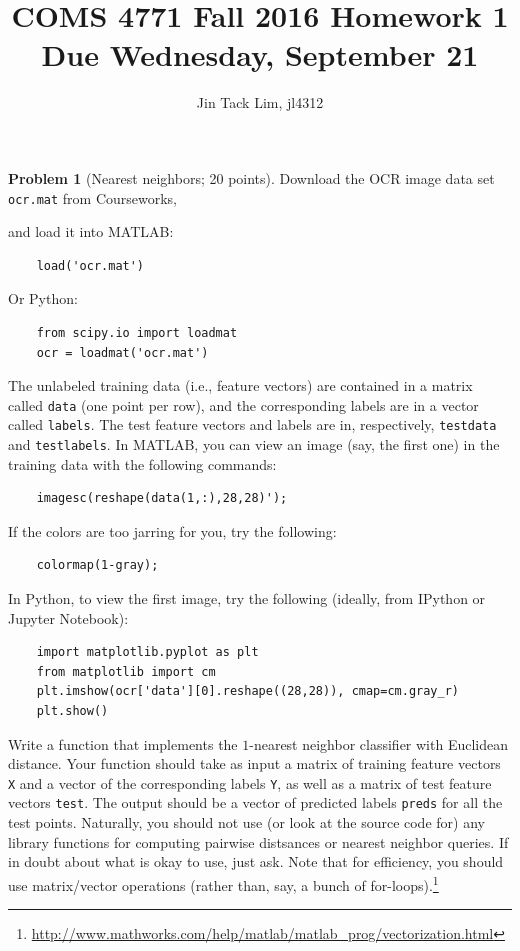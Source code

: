 \documentclass[11pt]{article}
\title{COMS 4771 Fall 2016 Homework 1 \\ Due Wednesday, September 21}
\author{Jin Tack Lim, jl4312
  }
\date{%
  }
\theoremstyle{definition}
\newtheorem{problem}{Problem}
\begin{document}
\maketitle

\newpage


\begin{problem}[Nearest neighbors; 20 points]
  \label{prob:nn}
  Download the OCR image data set \texttt{ocr.mat} from Courseworks,

  and load it into MATLAB:
  \lstset{language=Matlab}
  \begin{lstlisting}
    load('ocr.mat')
  \end{lstlisting}
  Or Python:
  \lstset{language=Python}
  \begin{lstlisting}
    from scipy.io import loadmat
    ocr = loadmat('ocr.mat')
  \end{lstlisting}

  The unlabeled training data (i.e., feature vectors) are contained in
  a matrix called \texttt{data} (one point per row), and the
  corresponding labels are in a vector called \texttt{labels}.
  The test feature vectors and labels are in, respectively,
  \texttt{testdata} and \texttt{testlabels}.
  In MATLAB, you can view an image (say, the first one) in the
  training data with the following commands:
  \lstset{language=Matlab}
  \begin{lstlisting}
    imagesc(reshape(data(1,:),28,28)');
  \end{lstlisting}
  If the colors are too jarring for you, try the following:
  \begin{lstlisting}
    colormap(1-gray);
  \end{lstlisting}
  In Python, to view the first image, try the following (ideally, from
  IPython or Jupyter Notebook):
  \lstset{language=Python}
  \begin{lstlisting}
    import matplotlib.pyplot as plt
    from matplotlib import cm
    plt.imshow(ocr['data'][0].reshape((28,28)), cmap=cm.gray_r)
    plt.show()
  \end{lstlisting}

  Write a function that implements the $1$-nearest neighbor classifier
  with Euclidean distance.
  Your function should take as input a matrix of training feature
  vectors \texttt{X} and a vector of the corresponding labels
  \texttt{Y}, as well as a matrix of test feature vectors
  \texttt{test}.
  The output should be a vector of predicted labels \texttt{preds} for
  all the test points.
  Naturally, you should not use (or look at the source code for) any library
  functions for computing pairwise distsances or nearest neighbor queries.
  If in doubt about what is okay to use, just ask.
  Note that for efficiency, you should use matrix/vector operations (rather
  than, say, a bunch of for-loops).\footnote{%
    \url{http://www.mathworks.com/help/matlab/matlab_prog/vectorization.html}%
  }


\end{problem}
\end{document}
